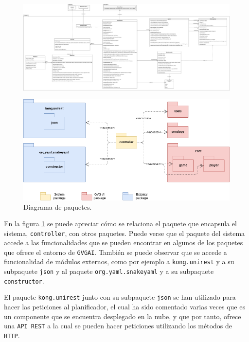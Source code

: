 \begin{figure}[H]
    \centering
    \includegraphics[trim=65cm 0cm 0cm 0cm, clip=true, angle=90, origin=c, scale=0.28]{img/CH07/class_diagram.png}
\end{figure}

\begin{figure}[H]
    \centering
    \includegraphics[scale=0.48]{img/CH07/package_diagram.png}
    \caption{Diagrama de paquetes.}
    \label{fig:package_diagram}
\end{figure}

En la figura \ref{fig:package_diagram} se puede apreciar cómo se relaciona el paquete
que encapsula el sistema, \texttt{controller}, con otros paquetes. Puede verse que el paquete del sistema
accede a las funcionalidades que se pueden encontrar en algunos de los paquetes que ofrece el entorno de
\texttt{GVGAI}. También se puede observar que se accede a funcionalidad de módulos externos, como por
ejemplo a \texttt{kong.unirest} y a su subpaquete \texttt{json} y al paquete \texttt{org.yaml.snakeyaml}
y a su subpaquete \texttt{constructor}.

El paquete \texttt{kong.unirest} junto con su subpaquete \texttt{json} se han utilizado
para hacer las peticiones al planificador, el cual ha sido comentado varias veces que es un componente
que se encuentra desplegado en la nube, y que por tanto, ofrece una \texttt{API REST} a la cual se
pueden hacer peticiones utilizando los métodos de \texttt{HTTP}.

